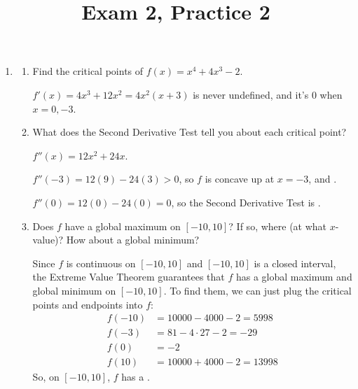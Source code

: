 \documentclass{article}
\theoremstyle{theorem}
\begin{document}
  \title{Exam 2, Practice 2}


\listofproblems

\begin{enumerate}
\item {} 

  \begin{enumerate}
  \item
    \begin{problem}[\vfill]
      Find the critical points of $f(x) = x^4 + 4x^3 -2$. 
    \end{problem}

    \begin{solution}
      $f'(x)=4x^3+12x^2=4x^2(x+3)$ is never undefined, and it's 0 when $x = \boxed{0, -3}$. 
    \end{solution}

  \item
    \begin{problem}[\nstretch{1.5}]
      What does the Second Derivative Test tell you about each critical point? 
    \end{problem}

    \begin{solution}
      $f''(x)=12x^2 + 24x$. 

      $f''(-3)=12(9)-24(3)>0$, so $f$ is concave up at $x = -3$, and .

      $f''(0) = 12(0)-24(0)=0$, so the Second Derivative Test is .
    \end{solution}

  \item
    \begin{problem}[\vfill]
      Does $f$ have a global maximum on $[-10, 10]$? If so, where (at what $x$-value)? How about a global minimum? 
    \end{problem}

    \begin{solution}
      Since $f$ is continuous on $[-10, 10]$ and $[-10, 10]$ is a closed interval, the Extreme Value Theorem guarantees that $f$ has a global maximum and global minimum on $[-10, 10]$. To find them, we can just plug the critical points and endpoints into $f$:
      \begin{align*}
        f(-10) &= 10000 - 4000 - 2 = 5998 \\
        f(-3) &= 81 - 4 \cdot 27 - 2 = -29 \\
        f(0) &= -2 \\
        f(10) &= 10000 + 4000 - 2 = 13998
      \end{align*}
      So, on $[-10, 10]$, $f$ has a . 
    \end{solution}


\end{enumerate}
\end{enumerate}
\end{document}
